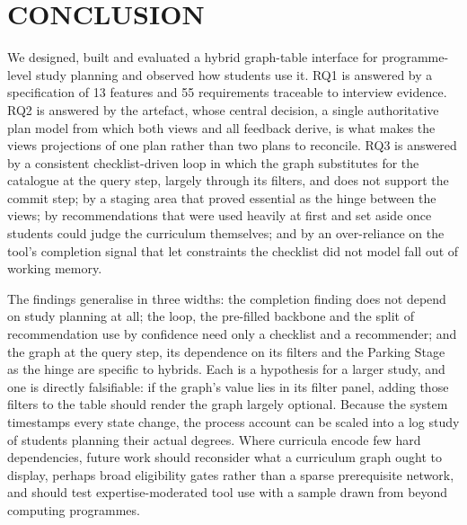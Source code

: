 \documentclass[a4paper,twoside]{article}
\begin{document}
\section{\uppercase{Conclusion}}
\label{sec:conclusion}

\noindent We designed, built and evaluated a hybrid graph-table interface for programme-level study planning and observed how students use it. RQ1 is answered by a specification of 13 features and 55 requirements traceable to interview evidence. RQ2 is answered by the artefact, whose central decision, a single authoritative plan model from which both views and all feedback derive, is what makes the views projections of one plan rather than two plans to reconcile. RQ3 is answered by a consistent checklist-driven loop in which the graph substitutes for the catalogue at the query step, largely through its filters, and does not support the commit step; by a staging area that proved essential as the hinge between the views; by recommendations that were used heavily at first and set aside once students could judge the curriculum themselves; and by an over-reliance on the tool's completion signal that let constraints the checklist did not model fall out of working memory.

The findings generalise in three widths: the completion finding does not depend on study planning at all; the loop, the pre-filled backbone and the split of recommendation use by confidence need only a checklist and a recommender; and the graph at the query step, its dependence on its filters and the Parking Stage as the hinge are specific to hybrids. Each is a hypothesis for a larger study, and one is directly falsifiable: if the graph's value lies in its filter panel, adding those filters to the table should render the graph largely optional. Because the system timestamps every state change, the process account can be scaled into a log study of students planning their actual degrees. Where curricula encode few hard dependencies, future work should reconsider what a curriculum graph ought to display, perhaps broad eligibility gates rather than a sparse prerequisite network, and should test expertise-moderated tool use with a sample drawn from beyond computing programmes.



{\small
}
\end{document}
